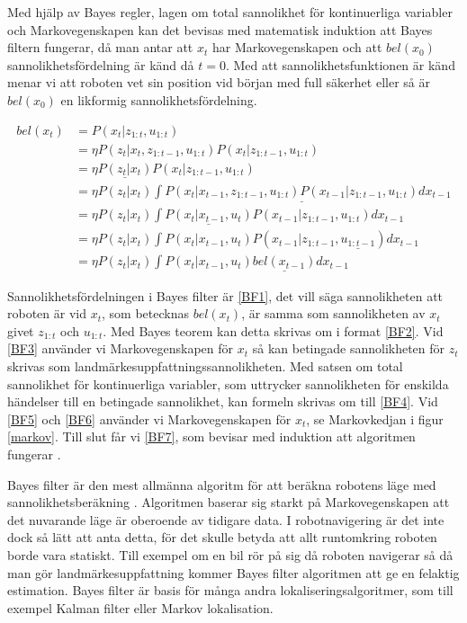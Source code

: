 Med hjälp av Bayes regler, lagen om total sannolikhet för kontinuerliga variabler och Markovegenskapen kan det bevisas med matematisk induktion att Bayes filtern fungerar, då man antar att $x_t$ har Markovegenskapen och att $bel(x_0)$ sannolikhetsfördelning är känd då $t = 0$. Med att sannolikhetsfunktionen är känd menar vi att roboten vet sin position vid början med full säkerhet eller så är $bel(x_0)$ en likformig sannolikhetsfördelning.

\begin{align}
bel(x_t) & = P(x_t | z_{1:t}, u_{1:t}) \tag{BF1}\label{BF1} \\
        & = \eta P(z_t | x_t, z_{1:t-1}, u_{1:t}) P(x_t | z_{1:t-1}, u_{1:t}) \tag{BF2}\label{BF2}\\
        & = \eta \underline{P(z_t | x_t)} P(x_t | z_{1:t-1}, u_{1:t}) \tag{BF3}\label{BF3}\\
        & = \eta P(z_t | x_t) \underline{\int P(x_t | x_{t-1}, z_{1:t-1}, u_{1:t}) P(x_{t-1} | z_{1:t-1}, u_{1:t}) dx_{t-1}} \tag{BF4}\label{BF4}\\
        & = \eta P(z_t | x_t) \int \underline{P(x_t | x_{t-1}, u_t)} P(x_{t-1} | z_{1:t-1}, u_{1:t}) dx_{t-1} \tag{BF5}\label{BF5}\\
        & = \eta P(z_t | x_t) \int P(x_t | x_{t-1}, u_t) P(x_{t-1} | z_{1:t-1}, \underline{u_{1:t-1}}) dx_{t-1} \tag{BF6}\label{BF6}\\
        & = \eta P(z_t | x_t) \int P(x_t | x_{t-1}, u_t) \underline{bel(x_{t-1})} dx_{t-1} \tag{BF7}\label{BF7}
\end{align}

Sannolikhetsfördelningen i Bayes filter är \ref{BF1}, det vill säga sannolikheten att roboten är vid $x_t$, som betecknas $bel(x_t)$, är samma som sannolikheten av $x_t$ givet $z_{1:t}$ och $u_{1:t}$. Med Bayes teorem kan detta skrivas om i format \ref{BF2}. Vid \ref{BF3} använder vi Markovegenskapen för $x_t$ så kan betingade sannolikheten för $z_t$ skrivas som landmärkesuppfattningssannolikheten. Med satsen om total sannolikhet för kontinuerliga variabler, som uttrycker sannolikheten för enskilda händelser till en betingade sannolikhet, kan formeln skrivas om till \ref{BF4}. Vid \ref{BF5} och \ref{BF6} använder vi Markovegenskapen för $x_t$, se Markovkedjan i figur \ref{markov}. Till slut får vi \ref{BF7}, som bevisar med induktion att algoritmen fungerar \citep{ProbabilisticRobotics}.

Bayes filter är den mest allmänna algoritm för att beräkna robotens läge med sannolikhetsberäkning \citep{ProbabilisticRobotics}. Algoritmen baserar sig starkt på Markovegenskapen att det nuvarande läge är oberoende av tidigare data. I robotnavigering är det inte dock så lätt att anta detta, för det skulle betyda att allt runtomkring roboten borde vara statiskt. Till exempel om en bil rör på sig då roboten navigerar så då man gör landmärkesuppfattning kommer Bayes filter algoritmen att ge en felaktig estimation. Bayes filter är basis för många andra lokaliseringsalgoritmer, som till exempel Kalman filter eller Markov lokalisation. 

